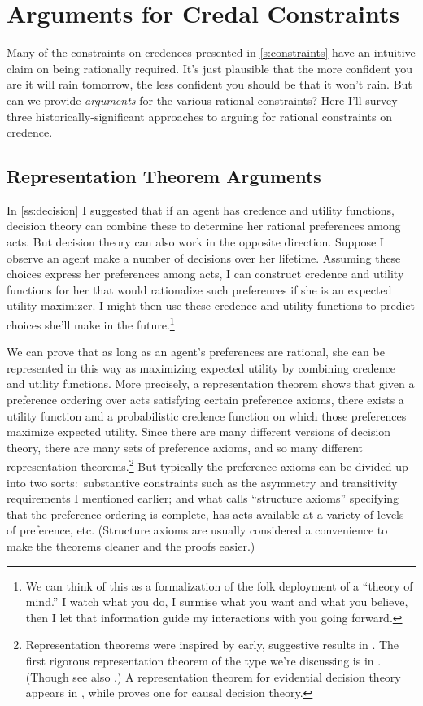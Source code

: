 \section{Arguments for Credal Constraints}
Many of the constraints on credences presented in \autoref{s:constraints} have an intuitive claim on being rationally required. It's just plausible that the more confident you are it will rain tomorrow, the less confident you should be that it won't rain. But can we provide \emph{arguments} for the various rational constraints? Here I'll survey three historically-significant approaches to arguing for rational constraints on credence.

\subsection{Representation Theorem Arguments} \label{ss:representation}
In \autoref{ss:decision} I suggested that if an agent has credence and utility functions, decision theory can combine these to determine her rational preferences among acts. But decision theory can also work in the opposite direction. Suppose I observe an agent make a number of decisions over her lifetime. Assuming these choices express her preferences among acts, I can construct credence and utility functions for her that would rationalize such preferences if she is an expected utility maximizer. I might then use these credence and utility functions to predict choices she'll make in the future.\footnote
{We can think of this as a formalization of the folk deployment of a ``theory of mind.'' I watch what you do, I surmise what you want and what you believe, then I let that information guide my interactions with you going forward.}

We can prove that as long as an agent's preferences are rational, she can be represented in this way as maximizing expected utility by combining credence and utility functions. More precisely, a representation theorem shows that given a preference ordering over acts satisfying certain preference axioms, there exists a utility function and a probabilistic credence function on which those preferences maximize expected utility. Since there are many different versions of decision theory, there are many sets of preference axioms, and so many different representation theorems.\footnote
{Representation theorems were inspired by early, suggestive results in \citet{RamseyTruth}. The first rigorous representation theorem of the type we're discussing is in \citet{SavageFoundations}. (Though see also \citealp{vonNeumannMorgenstern}.) A representation theorem for evidential decision theory appears in \citet{JeffreyLogic}, while \citet{JoyceCausal} proves one for causal decision theory.}
 But typically the preference axioms can be divided up into two sorts:\ substantive constraints such as the asymmetry and transitivity requirements I mentioned earlier; and what \citet{SuppesMetaphysics} calls ``structure axioms'' specifying that the preference ordering is complete, has acts available at a variety of levels of preference, etc. (Structure axioms are usually considered a convenience to make the theorems cleaner and the proofs easier.)

